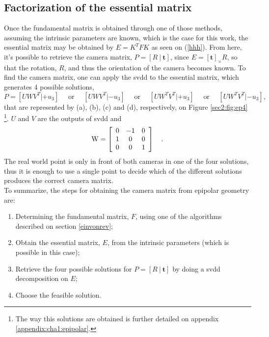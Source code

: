 \subsection{Factorization of the essential matrix}
\label{cha2:epipolar:fact}
Once the fundamental matrix is obtained through one of those methods, assuming the intrinsic parameters are known, which is the case for this work, the essential matrix may be obtained by $E = K^{T}  F K$ as seen on (\ref{hhh}).
From here, it's possible to retrieve the camera matrix, $P = [R \ | \ \mathbf{t}]$, since $E = [\mathbf{t}]_\times R$, so that the rotation, $R$, and thus the orientation of the camera becomes known.
To find the camera matrix, one can apply the \acrshort{svdd} to the essential matrix, which generates 4 possible solutions,
\begin{equation}
P = \left[UWV^T | + u_{ 3 } \right] \quad \text { or } \quad \left[ UWV^T | - u_ { 3 } \right] \quad \text { or } \quad \left[ UW^T V^T | + u_ { 3 } \right] \quad \text { or } \quad \left[ UW^T V^T |- u _ { 3 } \right],
\end{equation}
that are represented by (a), (b), (c) and (d), respectively, on Figure \ref{sec2:fig:ep4} \footnote{The way this solutions are obtained is further detailed on appendix \ref{appendix:cha1:epipolar}.}. $U$ and $V$ are the outputs of \acrshort{svdd} and 
\begin{equation}
	\mathrm { W } = \left[ \begin{array} { c c c } { 0 } & { - 1 } & { 0 } \\ { 1 } & { 0 } & { 0 } \\ { 0 } & { 0 } & { 1 } \end{array} \right] \quad.
\end{equation}
The real world point is only in front of both cameras in one of the four solutions, thus it is enough to use a single point to decide which of the different solutions produces the correct camera matrix. \cite{multiview}\\

To summarize, the steps for obtaining the camera matrix from epipolar geometry are:

\begin{enumerate}
	\item Determining the fundamental matrix, $F$, using one of the algorithms described on section \ref{einvonrev};
	\item Obtain the essential matrix, $E$, from the intrinsic parameters (which is possible in this case);
	\item Retrieve the four possible solutions for $P = [R \ | \ \mathbf{t}]$ by doing a \acrshort{svdd} decomposition on $E$;
	\item Choose the feasible solution.
\end{enumerate}


